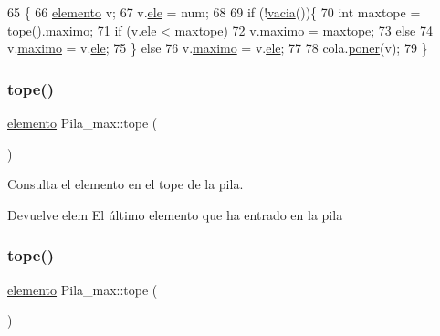 \begin{DoxyCode}
65                            \{
66     \hyperlink{structelemento}{elemento} v;
67     v.\hyperlink{structelemento_a954579dc7ed0033eefa875742ece867b}{ele} = num;
68     
69     \textcolor{keywordflow}{if} (!\hyperlink{classPila__max_a4b5784d89db4908b84a4ece46bc179fb}{vacia}())\{
70         \textcolor{keywordtype}{int} maxtope = \hyperlink{classPila__max_a14209c559be8250baeb0e3366e088462}{tope}().\hyperlink{structelemento_aefc00344a4cf9303417ccab8158bb803}{maximo};
71         \textcolor{keywordflow}{if} (v.\hyperlink{structelemento_a954579dc7ed0033eefa875742ece867b}{ele} < maxtope)
72             v.\hyperlink{structelemento_aefc00344a4cf9303417ccab8158bb803}{maximo} = maxtope;
73         \textcolor{keywordflow}{else}
74             v.\hyperlink{structelemento_aefc00344a4cf9303417ccab8158bb803}{maximo} = v.\hyperlink{structelemento_a954579dc7ed0033eefa875742ece867b}{ele};
75     \} \textcolor{keywordflow}{else}
76         v.\hyperlink{structelemento_aefc00344a4cf9303417ccab8158bb803}{maximo} = v.\hyperlink{structelemento_a954579dc7ed0033eefa875742ece867b}{ele};
77     
78     cola.\hyperlink{classCola_a4a902e5805ae74f8d80c6f3267fd14c4}{poner}(v);
79 \}
\end{DoxyCode}
\mbox{\label{classPila__max_a14209c559be8250baeb0e3366e088462}} 
\subsubsection{\texorpdfstring{tope()}{tope()}\hspace{0.1cm}{\footnotesize\ttfamily [1/2]}}
{\footnotesize\ttfamily \hyperlink{structelemento}{elemento} Pila\+\_\+max\+::tope (\begin{DoxyParamCaption}{ }\end{DoxyParamCaption})}



Consulta el elemento en el tope de la pila. 

\begin{DoxyReturn}{Devuelve}
elem El último elemento que ha entrado en la pila 
\end{DoxyReturn}
\mbox{\label{classPila__max_a14209c559be8250baeb0e3366e088462}} 
\subsubsection{\texorpdfstring{tope()}{tope()}\hspace{0.1cm}{\footnotesize\ttfamily [2/2]}}
{\footnotesize\ttfamily \hyperlink{structelemento}{elemento} Pila\+\_\+max\+::tope (\begin{DoxyParamCaption}{ }\end{DoxyParamCaption})}



